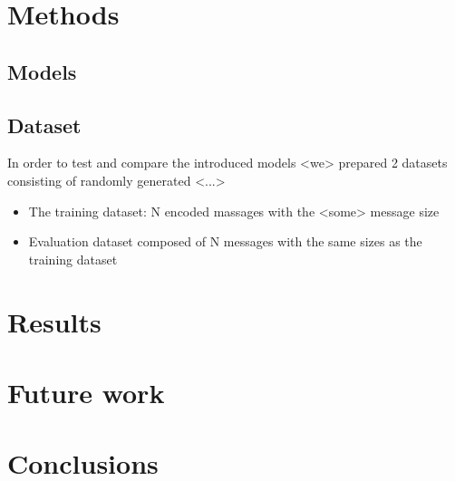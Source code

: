 \documentclass{article}
\begin{document}
\section{Methods}
\subsection{Models}


\subsection{Dataset}

In order to test and compare the introduced models <we> prepared 2 datasets consisting of randomly generated <...>

\begin{itemize}
    \item The training dataset: N encoded massages with the <some> message size
    \item Evaluation dataset composed of N messages with the same sizes as the training dataset
\end{itemize}


\section{Results}

\section{Future work}

\section{Conclusions}
\end{document}
